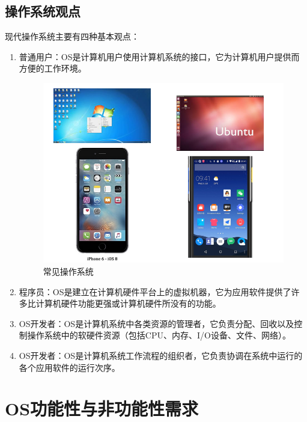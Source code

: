 \subsection{操作系统观点}

现代操作系统主要有四种基本观点：

\begin{enumerate}
	\item 普通用户：OS是计算机用户使用计算机系统的接口，它为计算机用户提供而方便的工作环境。
	      \begin{figure}[H]
		      \centering
		      \includegraphics[scale=0.7]{img/C1/1-1/1.png}
		      \caption{常见操作系统}
	      \end{figure}

	\item 程序员：OS是建立在计算机硬件平台上的虚拟机器，它为应用软件提供了许多比计算机硬件功能更强或计算机硬件所没有的功能。

	\item OS开发者：OS是计算机系统中各类资源的管理者，它负责分配、回收以及控制操作系统中的软硬件资源（包括CPU、内存、I/O设备、文件、网络）。

	\item OS开发者：OS是计算机系统工作流程的组织者，它负责协调在系统中运行的各个应用软件的运行次序。
\end{enumerate}

\newpage

\section{OS功能性与非功能性需求}

